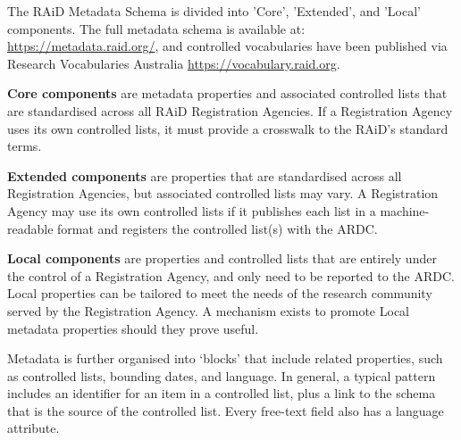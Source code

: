 The RAiD Metadata Schema is divided into 'Core', 'Extended', and 'Local' components. The full metadata schema is available at: \href{https://metadata.raid.org/}{https://metadata.raid.org/}, and controlled vocabularies have been published via Research Vocabularies Australia \href{https://vocabulary.raid.org}{https://vocabulary.raid.org}.

\textbf{Core components} are metadata properties and associated controlled lists that are standardised across all RAiD Registration Agencies. If a Registration Agency uses its own controlled lists, it must provide a crosswalk to the RAiD’s standard terms.

\textbf{Extended components} are properties that are standardised across all Registration Agencies, but associated controlled lists may vary. A Registration Agency may use its own controlled lists if it publishes each list in a machine-readable format and registers the controlled list(s) with the ARDC. 

\textbf{Local components} are properties and controlled lists that are entirely under the control of a Registration Agency, and only need to be reported to the ARDC. Local properties can be tailored to meet the needs of the research community served by the Registration Agency. A mechanism exists to promote Local metadata properties should they prove useful.

Metadata is further organised into ‘blocks’ that include related properties, such as controlled lists, bounding dates, and language. In general, a typical pattern includes an identifier for an item in a controlled list, plus a link to the schema that is the source of the controlled list. Every free-text field also has a language attribute.